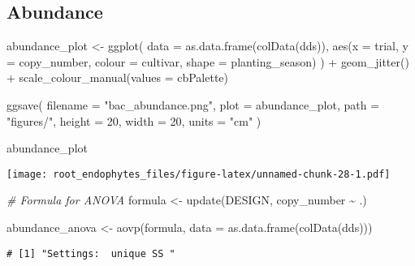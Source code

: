 \documentclass[
]{article}
\newenvironment{Shaded}{\begin{snugshade}}{\end{snugshade}}
\newcommand{\AttributeTok}[1]{\textcolor[rgb]{0.77,0.63,0.00}{#1}}
\newcommand{\CommentTok}[1]{\textcolor[rgb]{0.56,0.35,0.01}{\textit{#1}}}
\newcommand{\DecValTok}[1]{\textcolor[rgb]{0.00,0.00,0.81}{#1}}
\newcommand{\FunctionTok}[1]{\textcolor[rgb]{0.00,0.00,0.00}{#1}}
\newcommand{\NormalTok}[1]{#1}
\newcommand{\OtherTok}[1]{\textcolor[rgb]{0.56,0.35,0.01}{#1}}
\newcommand{\SpecialCharTok}[1]{\textcolor[rgb]{0.00,0.00,0.00}{#1}}
\newcommand{\StringTok}[1]{\textcolor[rgb]{0.31,0.60,0.02}{#1}}
\begin{document}
\hypertarget{abundance-1}{%
\subsection{Abundance}\label{abundance-1}}

\begin{Shaded}
\begin{Highlighting}[]
\NormalTok{abundance\_plot }\OtherTok{\textless{}{-}} \FunctionTok{ggplot}\NormalTok{(}
  \AttributeTok{data =} \FunctionTok{as.data.frame}\NormalTok{(}\FunctionTok{colData}\NormalTok{(dds)), }
  \FunctionTok{aes}\NormalTok{(}\AttributeTok{x =}\NormalTok{ trial, }\AttributeTok{y =}\NormalTok{ copy\_number, }\AttributeTok{colour =}\NormalTok{ cultivar, }\AttributeTok{shape =}\NormalTok{ planting\_season)}
\NormalTok{) }\SpecialCharTok{+} \FunctionTok{geom\_jitter}\NormalTok{() }\SpecialCharTok{+} 
  \FunctionTok{scale\_colour\_manual}\NormalTok{(}\AttributeTok{values =}\NormalTok{ cbPalette)}

\FunctionTok{ggsave}\NormalTok{(}
  \AttributeTok{filename =} \StringTok{"bac\_abundance.png"}\NormalTok{, }\AttributeTok{plot =}\NormalTok{ abundance\_plot, }\AttributeTok{path =} \StringTok{"figures/"}\NormalTok{, }
  \AttributeTok{height =} \DecValTok{20}\NormalTok{, }\AttributeTok{width =} \DecValTok{20}\NormalTok{, }\AttributeTok{units =} \StringTok{"cm"}
\NormalTok{)}

\NormalTok{abundance\_plot}
\end{Highlighting}
\end{Shaded}

\texttt{[image: root\_endophytes\_files/figure-latex/unnamed-chunk-28-1.pdf]}

\begin{Shaded}
\begin{Highlighting}[]
\CommentTok{\# Formula for ANOVA}
\NormalTok{formula }\OtherTok{\textless{}{-}} \FunctionTok{update}\NormalTok{(DESIGN, copy\_number }\SpecialCharTok{\textasciitilde{}}\NormalTok{ .)}

\NormalTok{abundance\_anova }\OtherTok{\textless{}{-}} \FunctionTok{aovp}\NormalTok{(formula, }\AttributeTok{data =} \FunctionTok{as.data.frame}\NormalTok{(}\FunctionTok{colData}\NormalTok{(dds)))}
\end{Highlighting}
\end{Shaded}

\begin{verbatim}
# [1] "Settings:  unique SS "
\end{verbatim}
\end{document}
